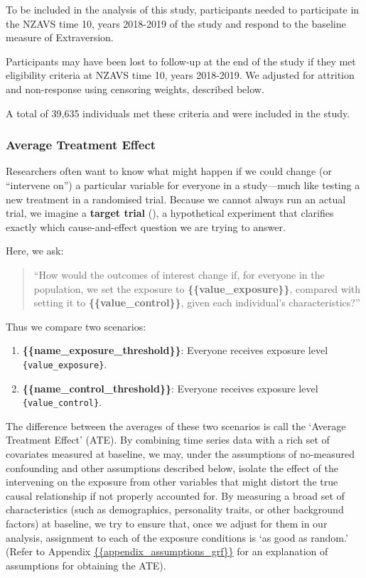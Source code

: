 \documentclass[
  single column]{article}
\providecommand{\tightlist}{%
  \setlength{\itemsep}{0pt}\setlength{\parskip}{0pt}}
\begin{document}
To be included in the analysis of this study, participants needed to
participate in the NZAVS time 10, years 2018-2019 of the study and
respond to the baseline measure of Extraversion.

Participants may have been lost to follow-up at the end of the study if
they met eligibility criteria at NZAVS time 10, years 2018-2019. We
adjusted for attrition and non-response using censoring weights,
described below.

A total of 39,635 individuals met these criteria and were included in
the study.

\subsubsection{Average Treatment Effect}\label{average-treatment-effect}

Researchers often want to know what might happen if we could change (or
``intervene on'') a particular variable for everyone in a study---much
like testing a new treatment in a randomised trial. Because we cannot
always run an actual trial, we imagine a \textbf{target trial}
(), a hypothetical
experiment that clarifies exactly which cause-and-effect question we are
trying to answer.

Here, we ask:

\begin{quote}
``How would the outcomes of interest change if, for everyone in the
population, we set the exposure to \textbf{\{\{value\_exposure\}\}},
compared with setting it to \textbf{\{\{value\_control\}\}}, given each
individual's characteristics?''
\end{quote}

Thus we compare two scenarios:

\begin{enumerate}
\def\labelenumi{\arabic{enumi}.}
\tightlist
\item
  \textbf{\{\{name\_exposure\_threshold\}\}}: Everyone receives exposure
  level \texttt{\{value\_exposure\}}.
\item
  \textbf{\{\{name\_control\_threshold\}\}}: Everyone receives exposure
  level \texttt{\{value\_control\}}.
\end{enumerate}

The difference between the averages of these two scenarios is call the
`Average Treatment Effect' (ATE). By combining time series data with a
rich set of covariates measured at baseline, we may, under the
assumptions of no-measured confounding and other assumptions described
below, isolate the effect of the intervening on the exposure from other
variables that might distort the true causal relationship if not
properly accounted for. By measuring a broad set of characteristics
(such as demographics, personality traits, or other background factors)
at baseline, we try to ensure that, once we adjust for them in our
analysis, assignment to each of the exposure conditions is `as good as
random.' (Refer to Appendix
\hyperref[appendix-assumptions_grf]{\{\{appendix\_assumptions\_grf\}\}}
for an explanation of assumptions for obtaining the ATE).
\end{document}
